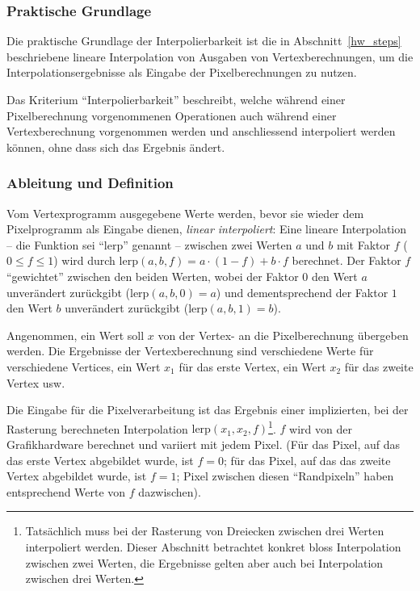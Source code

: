 \documentclass[twoside,a4paper,fleqn,12pt]{book}
\begin{document}
\subsubsection{Praktische Grundlage}

Die praktische Grundlage der Interpolierbarkeit ist die in Abschnitt~\ref{hw_steps} beschriebene lineare Interpolation von Ausgaben
von Vertexberechnungen, um die Interpolationsergebnisse als Eingabe der Pixelberechnungen zu nutzen.

Das Kriterium "`Interpolierbarkeit"' beschreibt, welche während einer Pixelberechnung vorgenommenen Operationen
auch während einer Vertexberechnung vorgenommen werden und anschliessend interpoliert werden können, ohne dass sich das Ergebnis ändert.

\subsubsection{Ableitung und Definition}
\newcommand\lerp{\mathrm{lerp}}
Vom Vertexprogramm ausgegebene Werte werden, bevor sie wieder dem Pixelprogramm als Eingabe dienen, \emph{linear interpoliert}: %
Eine lineare Interpolation -- die Funktion sei "`$\lerp$"' genannt -- zwischen zwei Werten $a$ und $b$ mit Faktor $f$ ($0 \le f \le 1$) wird durch $\lerp(a, b, f) = a \cdot (1-f) + b \cdot f$ berechnet.
Der Faktor $f$ "`gewichtet"' zwischen den beiden Werten, wobei der Faktor $0$ den Wert $a$ unverändert zurückgibt ($\lerp(a, b, 0) = a$)
und dementsprechend der Faktor $1$ den Wert $b$ unverändert zurückgibt ($\lerp(a, b, 1) = b$).

Angenommen, ein Wert soll $x$ von der Vertex- an die Pixelberechnung übergeben werden.
Die Ergebnisse der Vertexberechnung sind verschiedene Werte für verschiedene Vertices, ein Wert $x_1$ für das erste Vertex, ein Wert $x_2$ für das zweite Vertex usw.

Die Eingabe für die Pixelverarbeitung ist das Ergebnis einer implizierten, bei der Rasterung berechneten Interpolation $\lerp(x_1, x_2, f)$\footnote{Tatsächlich muss bei der Rasterung von Dreiecken zwischen drei Werten interpoliert werden. Dieser Abschnitt betrachtet konkret
bloss Interpolation zwischen zwei Werten, die Ergebnisse gelten aber auch bei Interpolation zwischen drei Werten.}.
$f$ wird von der Grafikhardware berechnet und variiert mit jedem Pixel. (Für das Pixel, auf das das erste Vertex abgebildet wurde, ist $f = 0$; für das Pixel,
auf das das zweite Vertex abgebildet wurde, ist $f = 1$; Pixel zwischen diesen "`Randpixeln"' haben entsprechend Werte von $f$ dazwischen).
\end{document}
